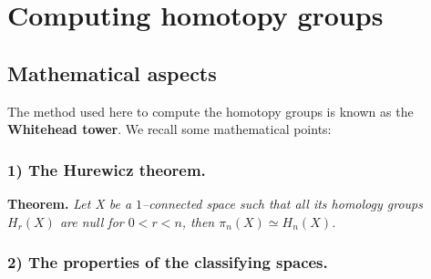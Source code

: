 \chapter {Computing homotopy groups}

\section {Mathematical aspects}

The method used here to compute the homotopy groups is  known as the {\bf Whitehead tower}.
We recall some mathematical points:

\subsection* {1) The Hurewicz theorem.}

{\bf Theorem.}
{\em Let X be a $1$--connected space such that all its homology groups $H_r(X)$ are null
for $0<r<n$, then $\pi_n(X)\simeq H_n(X)$.}

\subsection* {2) The properties of the classifying spaces.}

